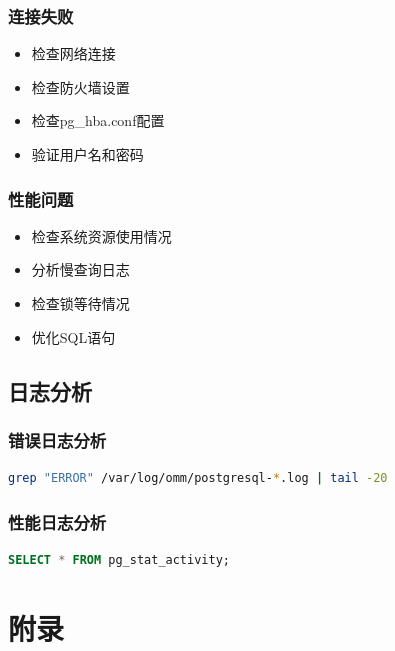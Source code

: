 \documentclass[12pt,UTF8]{ctexbook}
\begin{document}
\subsection{连接失败}

\begin{itemize}[leftmargin=2cm]
    \item 检查网络连接
    \item 检查防火墙设置
    \item 检查pg\_hba.conf配置
    \item 验证用户名和密码
\end{itemize}

\subsection{性能问题}

\begin{itemize}[leftmargin=2cm]
    \item 检查系统资源使用情况
    \item 分析慢查询日志
    \item 检查锁等待情况
    \item 优化SQL语句
\end{itemize}

\section{日志分析}

\subsection{错误日志分析}

\begin{lstlisting}[language=bash, caption=分析错误日志]
grep "ERROR" /var/log/omm/postgresql-*.log | tail -20
\end{lstlisting}

\subsection{性能日志分析}

\begin{lstlisting}[language=sql, caption=查看性能统计]
SELECT * FROM pg_stat_activity;
\end{lstlisting}

\chapter{附录}
\end{document}
